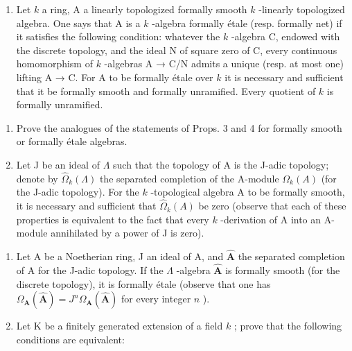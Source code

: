 
\begin{enumerate}
\def\labelenumi{\arabic{enumi})}
\tightlist
\item
  Let \(k\) a ring, A a linearly topologized formally smooth \(k\) -linearly topologized algebra. One says that A is a \(k\) -algebra formally étale (resp. formally net) if it satisfies the following condition: whatever the \(k\) -algebra C, endowed with the discrete topology, and the ideal N of square zero of C, every continuous homomorphism of \(k\) -algebras A → C/N admits a unique (resp. at most one) lifting A → C. For A to be formally étale over \(k\) it is necessary and sufficient that it be formally smooth and formally unramified. Every quotient of \(k\) is formally unramified.
\end{enumerate}

\begin{enumerate}
\def\labelenumi{\alph{enumi})}
\item
  Prove the analogues of the statements of Props. 3 and 4 for formally smooth or formally étale algebras.
\item
  Let J be an ideal of \(\Lambda\) such that the topology of A is the J-adic topology; denote by \(\widehat{\Omega}_{k}(\Lambda)\) the separated completion of the A-module \(\Omega_{k}(A)\) (for the J-adic topology). For the \(k\) -topological algebra A to be formally smooth, it is necessary and sufficient that \(\widehat{\Omega}_{k}(A)\) be zero (observe that each of these properties is equivalent to the fact that every \(k\) -derivation of A into an A-module annihilated by a power of J is zero).
\end{enumerate}

\begin{enumerate}
\def\labelenumi{\arabic{enumi})}
\setcounter{enumi}{1}
\item
  Let A be a Noetherian ring, J an ideal of A, and \(\widehat{\mathbf{A}}\) the separated completion of A for the J-adic topology. If the \(\Lambda\) -algebra \(\widehat{\mathbf{A}}\) is formally smooth (for the discrete topology), it is formally étale (observe that one has \(\Omega_{\mathbf{A}}(\widehat{\mathbf{A}}) = J^{n}\Omega_{\mathbf{A}}(\widehat{\mathbf{A}})\) for every integer \(n\) ).
\item
  Let K be a finitely generated extension of a field \(k\) ; prove that the following conditions are equivalent:
\end{enumerate}


